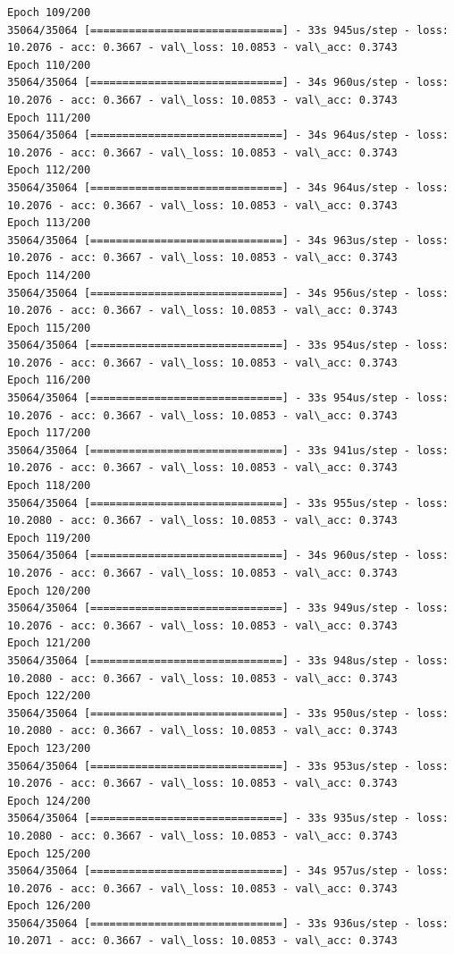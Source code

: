 \documentclass[11pt]{article}
\begin{document}
\begin{Verbatim}[commandchars=\\\{\}]
Epoch 109/200
35064/35064 [==============================] - 33s 945us/step - loss: 10.2076 - acc: 0.3667 - val\_loss: 10.0853 - val\_acc: 0.3743
Epoch 110/200
35064/35064 [==============================] - 34s 960us/step - loss: 10.2076 - acc: 0.3667 - val\_loss: 10.0853 - val\_acc: 0.3743
Epoch 111/200
35064/35064 [==============================] - 34s 964us/step - loss: 10.2076 - acc: 0.3667 - val\_loss: 10.0853 - val\_acc: 0.3743
Epoch 112/200
35064/35064 [==============================] - 34s 964us/step - loss: 10.2076 - acc: 0.3667 - val\_loss: 10.0853 - val\_acc: 0.3743
Epoch 113/200
35064/35064 [==============================] - 34s 963us/step - loss: 10.2076 - acc: 0.3667 - val\_loss: 10.0853 - val\_acc: 0.3743
Epoch 114/200
35064/35064 [==============================] - 34s 956us/step - loss: 10.2076 - acc: 0.3667 - val\_loss: 10.0853 - val\_acc: 0.3743
Epoch 115/200
35064/35064 [==============================] - 33s 954us/step - loss: 10.2076 - acc: 0.3667 - val\_loss: 10.0853 - val\_acc: 0.3743
Epoch 116/200
35064/35064 [==============================] - 33s 954us/step - loss: 10.2076 - acc: 0.3667 - val\_loss: 10.0853 - val\_acc: 0.3743
Epoch 117/200
35064/35064 [==============================] - 33s 941us/step - loss: 10.2076 - acc: 0.3667 - val\_loss: 10.0853 - val\_acc: 0.3743
Epoch 118/200
35064/35064 [==============================] - 33s 955us/step - loss: 10.2080 - acc: 0.3667 - val\_loss: 10.0853 - val\_acc: 0.3743
Epoch 119/200
35064/35064 [==============================] - 34s 960us/step - loss: 10.2076 - acc: 0.3667 - val\_loss: 10.0853 - val\_acc: 0.3743
Epoch 120/200
35064/35064 [==============================] - 33s 949us/step - loss: 10.2076 - acc: 0.3667 - val\_loss: 10.0853 - val\_acc: 0.3743
Epoch 121/200
35064/35064 [==============================] - 33s 948us/step - loss: 10.2080 - acc: 0.3667 - val\_loss: 10.0853 - val\_acc: 0.3743
Epoch 122/200
35064/35064 [==============================] - 33s 950us/step - loss: 10.2080 - acc: 0.3667 - val\_loss: 10.0853 - val\_acc: 0.3743
Epoch 123/200
35064/35064 [==============================] - 33s 953us/step - loss: 10.2076 - acc: 0.3667 - val\_loss: 10.0853 - val\_acc: 0.3743
Epoch 124/200
35064/35064 [==============================] - 33s 935us/step - loss: 10.2080 - acc: 0.3667 - val\_loss: 10.0853 - val\_acc: 0.3743
Epoch 125/200
35064/35064 [==============================] - 34s 957us/step - loss: 10.2076 - acc: 0.3667 - val\_loss: 10.0853 - val\_acc: 0.3743
Epoch 126/200
35064/35064 [==============================] - 33s 936us/step - loss: 10.2071 - acc: 0.3667 - val\_loss: 10.0853 - val\_acc: 0.3743

\end{Verbatim}
\end{document}
